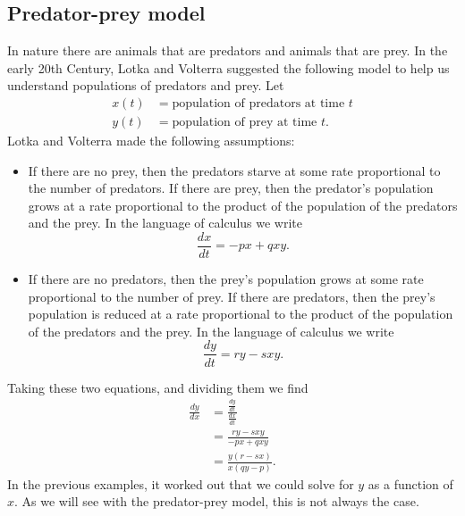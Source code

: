 \documentclass{ximera}
\begin{document}
\subsection{Predator-prey model}

In nature there are animals that are predators and animals that are
prey. In the early 20th Century, Lotka and Volterra suggested the
following model to help us understand populations of predators and
prey. Let
\begin{align*}
  x(t) &= \text{population of predators at time $t$}\\
  y(t) &= \text{population of prey at time $t$}.
\end{align*}
Lotka and Volterra made the following assumptions:
\begin{itemize}
  \item If there are no prey, then the predators starve at some rate
    proportional to the number of predators. If there are prey, then
    the predator's population grows at a rate proportional to the product of the
    population of the predators and the prey. In the language of calculus we write
    \[
    \frac{dx}{dt} = -p x + q x y.
    \]
  \item If there are no predators, then the prey's population grows
    at some rate proportional to the number of prey. If there are
    predators, then the prey's population is reduced at a rate
    proportional to the product of the population of the predators and
    the prey. In the language of calculus we write
    \[
    \frac{dy}{dt} = r y - s xy.
    \]
\end{itemize}
Taking these two equations, and dividing them we find
\begin{align*}
\frac{dy}{dx} &= \frac{\frac{dy}{dt}}{\frac{dx}{dt}}\\
&=\frac{r y - s xy}{-p x + q x y}\\
&=\frac{y(r-sx)}{x(qy-p)}.
\end{align*}
In the previous examples, it worked out that we could solve for $y$ as
a function of $x$.  As we will see with the predator-prey model, this
is not always the case.
\end{document}
